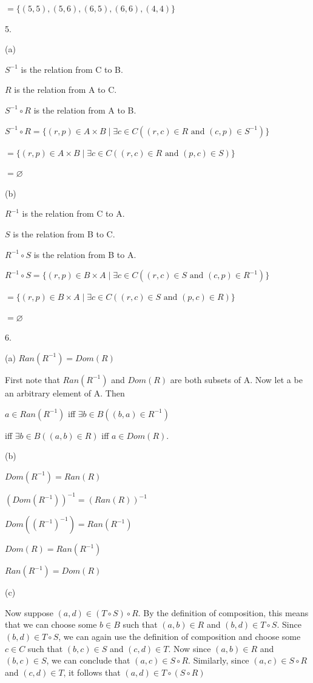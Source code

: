 \documentclass{article}
\newcommand{\vs}{\vspace{30pt}}
\begin{document}
\quad $=\{(5,5),(5,6),(6,5),(6,6),(4,4)\}$
\vs

5.

(a)

$S^{-1}$ is the relation from C to B.

$R$ is the relation from A to C.

$S^{-1} \circ R$ is the relation from A to B.

$S^{-1} \circ R = \{(r,p) \in A \times B \mid \exists c \in C ((r, c) \in R \text{ and } (c, p) \in S^{-1})\}$

\quad $=\{(r,p) \in A \times B \mid \exists c \in C ((r, c) \in R \text{ and } (p, c) \in S)\}$

\quad $=\varnothing$
\vs

(b)

$R^{-1}$ is the relation from C to A.

$S$ is the relation from B to C.

$R^{-1} \circ S$ is the relation from B to A.

$R^{-1} \circ S = \{(r,p) \in B \times A \mid \exists c \in C ((r,c) \in S \text{ and } (c,p) \in R^{-1})\}$

\quad $=\{(r,p) \in B \times A \mid \exists c \in C ((r,c) \in S \text{ and } (p,c) \in R)\}$

\quad $=\varnothing$
\vs

6.

(a) $Ran(R^{-1}) = Dom(R)$

First note that $Ran(R^{-1})$ and $Dom(R)$ are both subsets of A. Now let a be an arbitrary element of A. Then

$a \in Ran(R^{-1})$ iff $\exists b \in B((b,a) \in R^{-1})$

\quad iff $\exists b \in B ((a,b) \in R)$ iff $a \in Dom(R)$.
\vs

(b)

$Dom(R^{-1}) = Ran(R)$

$(Dom(R^{-1}))^{-1} = (Ran(R))^{-1}$

$Dom((R^{-1})^{-1}) = Ran(R^{-1})$

$Dom(R) = Ran(R^{-1})$

$Ran(R^{-1}) = Dom(R)$
\vs

(c)

Now suppose $(a, d) \in (T \circ S) \circ R$. By the definition of composition, this means that we can choose some $b \in B$ such that $(a,b) \in R$ and $(b,d) \in T \circ S$. Since $(b,d) \in T \circ S$, we can again use the definition of composition and choose some $c \in C$ such that $(b,c) \in S$ and $(c,d) \in T$. Now since $(a, b) \in R$ and $(b,c) \in S$, we can conclude that $(a,c) \in S \circ R$. Similarly, since $(a,c) \in S \circ R$ and $(c,d) \in T$, it follows that $(a,d) \in T \circ (S \circ R)$
\vs
\end{document}
